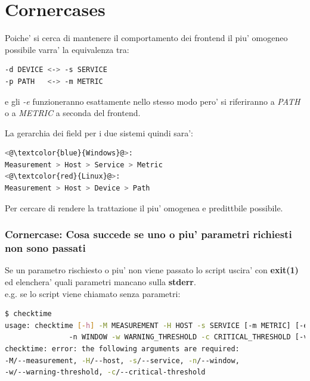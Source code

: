 \documentclass{article}
\begin{document}
\clearpage
\section*{Cornercases}
Poiche' si cerca di mantenere il comportamento dei frontend il piu' omogeneo possibile varra' la equivalenza tra:

\begin{lstlisting}[language=Bash]
-d DEVICE <-> -s SERVICE
-p PATH   <-> -m METRIC
\end{lstlisting}
e gli \textit{-e} funzioneranno esattamente nello stesso modo pero' si riferiranno a \textit{PATH} o a \textit{METRIC} a seconda del frontend.

La gerarchia dei field per i due sistemi quindi sara':
\begin{lstlisting}[language=Bash]
<@\textcolor{blue}{Windows}@>:
Measurement > Host > Service > Metric
<@\textcolor{red}{Linux}@>:
Measurement > Host > Device > Path
\end{lstlisting}
Per cercare di rendere la trattazione il piu' omogenea e predittbile possibile.

\subsubsection*{Cornercase: Cosa succede se uno o piu' parametri richiesti non sono passati}
Se un parametro rischiesto o piu' non viene passato lo script uscira' con \textbf{exit(1)} ed elenchera' quali parametri mancano sulla \textbf{stderr}.
\\
e.g. se lo script viene chiamato senza parametri:
\begin{lstlisting}[language=Bash]
$ checktime
usage: checktime [-h] -M MEASUREMENT -H HOST -s SERVICE [-m METRIC] [-e EXCLUDE]
               -n WINDOW -w WARNING_THRESHOLD -c CRITICAL_THRESHOLD [-v {0,1}]
checktime: error: the following arguments are required:
-M/--measurement, -H/--host, -s/--service, -n/--window,
-w/--warning-threshold, -c/--critical-threshold
\end{lstlisting}
\end{document}
